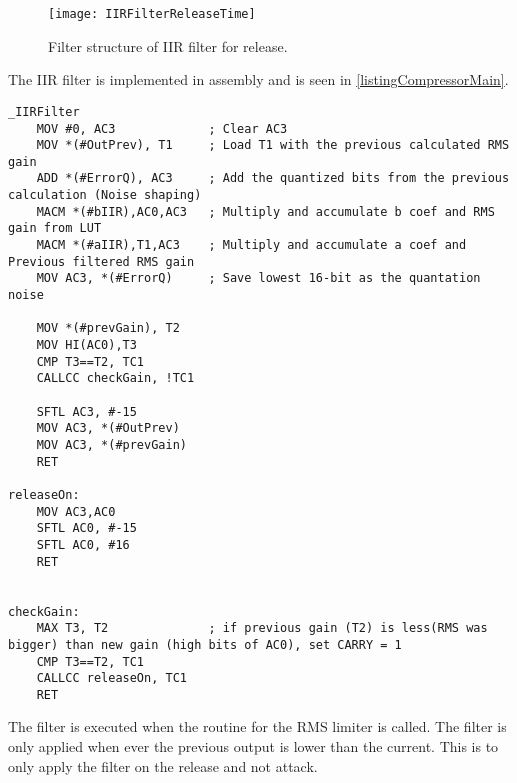 \begin{figure}[H]
\centering
\texttt{[image: IIRFilterReleaseTime]}
\caption{Filter structure of IIR filter for release.}
\label{fig:IIRFilterReleaseTime}
\end{figure}

The IIR filter is implemented in assembly and is seen in \autoref{listingCompressorMain}. 

\begin{lstlisting}[language={[x86masm]Assembler}, caption = {Release time algorithm.},label={listingCompressorMain}]
_IIRFilter
	MOV #0, AC3				; Clear AC3
	MOV *(#OutPrev), T1		; Load T1 with the previous calculated RMS gain
	ADD *(#ErrorQ), AC3		; Add the quantized bits from the previous calculation (Noise shaping)
	MACM *(#bIIR),AC0,AC3	; Multiply and accumulate b coef and RMS gain from LUT
	MACM *(#aIIR),T1,AC3	; Multiply and accumulate a coef and Previous filtered RMS gain
	MOV AC3, *(#ErrorQ)		; Save lowest 16-bit as the quantation noise
	
	MOV *(#prevGain), T2
	MOV HI(AC0),T3
	CMP T3==T2, TC1
	CALLCC checkGain, !TC1
	
	SFTL AC3, #-15
	MOV AC3, *(#OutPrev)
	MOV AC3, *(#prevGain)
	RET

releaseOn:
	MOV AC3,AC0
	SFTL AC0, #-15
	SFTL AC0, #16
	RET
	

checkGain:
	MAX T3, T2				; if previous gain (T2) is less(RMS was bigger) than new gain (high bits of AC0), set CARRY = 1
	CMP T3==T2, TC1
	CALLCC releaseOn, TC1
	RET
\end{lstlisting}

The filter is executed when the routine for the RMS limiter is called. The filter is only applied when ever the previous output is lower than the current. This is to only apply the filter on the release and not attack.




